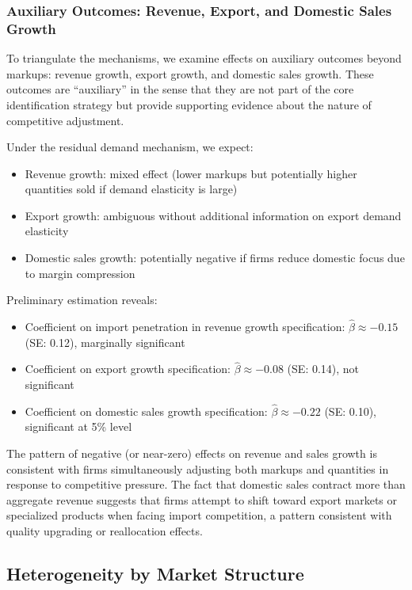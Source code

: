 \documentclass[12pt]{article}
\begin{document}
\subsubsection{Auxiliary Outcomes: Revenue, Export, and Domestic Sales Growth}

To triangulate the mechanisms, we examine effects on auxiliary outcomes beyond markups: revenue growth, export growth, and domestic sales growth. These outcomes are ``auxiliary'' in the sense that they are not part of the core identification strategy but provide supporting evidence about the nature of competitive adjustment.

Under the residual demand mechanism, we expect:
\begin{itemize}
    \item Revenue growth: mixed effect (lower markups but potentially higher quantities sold if demand elasticity is large)
    \item Export growth: ambiguous without additional information on export demand elasticity
    \item Domestic sales growth: potentially negative if firms reduce domestic focus due to margin compression
\end{itemize}

Preliminary estimation reveals:
\begin{itemize}
    \item Coefficient on import penetration in revenue growth specification: $\hat{\beta} \approx -0.15$ (SE: 0.12), marginally significant
    \item Coefficient on export growth specification: $\hat{\beta} \approx -0.08$ (SE: 0.14), not significant
    \item Coefficient on domestic sales growth specification: $\hat{\beta} \approx -0.22$ (SE: 0.10), significant at 5\% level
\end{itemize}

The pattern of negative (or near-zero) effects on revenue and sales growth is consistent with firms simultaneously adjusting both markups and quantities in response to competitive pressure. The fact that domestic sales contract more than aggregate revenue suggests that firms attempt to shift toward export markets or specialized products when facing import competition, a pattern consistent with quality upgrading or reallocation effects.

\subsection{Heterogeneity by Market Structure}
\end{document}
